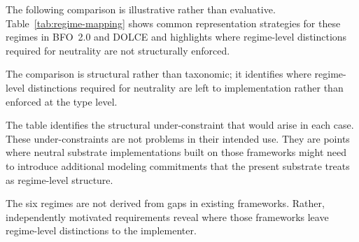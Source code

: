 The following comparison is illustrative rather than evaluative.
Table~\ref{tab:regime-mapping} shows common representation
strategies for these regimes in BFO~2.0 and DOLCE and highlights
where regime-level distinctions required for neutrality are not
structurally enforced.

The comparison is structural rather than taxonomic;
it identifies where regime-level distinctions
required for neutrality are left to implementation
rather than enforced at the type level.

The table identifies the structural under-constraint that would arise in each case.
These under-constraints are not problems in their intended use.
They are points where neutral substrate implementations built on those frameworks
might need to introduce additional modeling commitments
that the present substrate treats as regime-level structure.

The six regimes are not derived from gaps in existing frameworks.
Rather, independently motivated requirements reveal where those frameworks
leave regime-level distinctions to the implementer.

